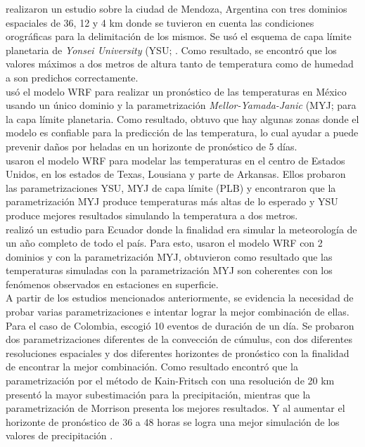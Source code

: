 \citet{Fernandez2011} realizaron un estudio sobre la ciudad de Mendoza, Argentina con tres dominios espaciales de 36, 12 y 4 km donde se tuvieron en cuenta las condiciones orográficas para la delimitación de los mismos. Se usó el esquema de capa límite planetaria de \textit{Yonsei University} (YSU; \citep{Hong2006}. Como resultado, se encontró que los valores máximos a dos metros de altura tanto de temperatura como de humedad a son predichos correctamente.\\

\citet{Corrales2015} usó el modelo WRF para realizar un pronóstico de las temperaturas en México usando un único dominio y la parametrización \textit{Mellor-Yamada-Janic} (MYJ; \citep{Janjic1994} para la capa límite planetaria. Como resultado, obtuvo que hay algunas zonas donde el modelo es confiable para la predicción de las temperatura, lo cual ayudar a puede prevenir daños por heladas en un horizonte de pronóstico de 5 días.\\

\citet{Hu2010} usaron el modelo WRF para modelar las temperaturas en el centro de Estados Unidos, en los estados de Texas, Lousiana y parte de Arkansas. Ellos probaron las  parametrizaciones YSU, MYJ de capa límite (PLB) y encontraron que la parametrización MYJ produce temperaturas más altas de lo esperado y YSU produce mejores resultados simulando la temperatura a dos metros.\\

\citet{Parra2012} realizó un estudio para Ecuador donde la finalidad era simular la meteorología de un año completo de todo el país. Para esto, usaron el modelo WRF con 2 dominios y con la parametrización MYJ, obtuvieron como resultado que las temperaturas simuladas con la parametrización MYJ son coherentes con los fenómenos observados en estaciones en superficie.\\


A partir de los estudios mencionados anteriormente, se evidencia la necesidad de probar varias parametrizaciones e intentar lograr la mejor combinación de ellas. Para el caso de Colombia, \citet{Uribe2012} escogió 10 eventos de duración de un día. Se probaron dos parametrizaciones diferentes de la convección de cúmulus, con dos diferentes resoluciones espaciales y dos diferentes horizontes de pronóstico con la finalidad de encontrar la mejor combinación. Como resultado encontró que la parametrización por el método de Kain-Fritsch \citep{JohnS2004} con una resolución de 20 km presentó la mayor subestimación para la precipitación, mientras que la parametrización de Morrison \citep{Morrison2009} presenta los mejores resultados. Y al aumentar el horizonte de pronóstico de 36 a 48 horas se logra una mejor simulación de los valores de precipitación \citep{Uribe2012}.\\

